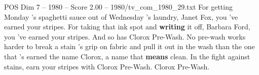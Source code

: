 \begin{textsample}{POS Dim 7 – 1980 – Score 2.00 – 1980/tv\_com\_1980\_29.txt}  \label{ex:f7_pos_042}
For getting Monday 's spaghetti sauce out of Wednesday 's laundry, Janet Fox, you 've earned your stripes.
For taking that ink spot and \textbf{writing} it off, Barbara Ford, you 've earned your stripes.
And so has Clorox Pre-Wash.
No pre-wash works harder to break a stain 's grip on fabric and pull it out in the wash than the one that 's earned the name Clorox, a name that \textbf{means} clean.
In the fight against stains, earn your stripes with Clorox Pre-Wash.
Clorox Pre-Wash.

\end{textsample}
